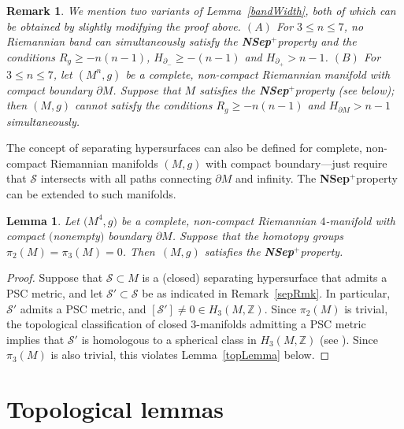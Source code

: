 \documentclass[10pt,a4paper]{amsart}
\numberwithin{equation}{section}
\newtheorem{Lemma}[Theorem]{Lemma}
\newtheorem{Remark}[Theorem]{Remark} }
\def\Z{\mathbb{Z}}
\def\Scal{\mathcal{S}}
\def\Nsep{\textbf{\textup{NSep}$^+$}}
\begin{document}
\begin{Remark}\label{bandNonexistence}
	We mention two variants of Lemma~\ref{bandWidth}, both of which can be obtained
	by slightly modifying the proof above.
	$(A)$ For $3\le n\le 7$,
	no Riemannian band can simultaneously satisfy the \Nsep property and
	the conditions
	$R_g \ge -n(n-1)$, $H_{\partial_-} \ge -(n-1)$ and $H_{\partial_+}> n-1$.
	$(B)$ For $3\le n\le 7$, let $(M^n,g)$ be a complete, non-compact Riemannian
	manifold with compact boundary $\partial M$. Suppose that
	$M$ satisfies the \Nsep property (see below); then $(M,g)$ cannot satisfy
	the conditions $R_g \ge -n(n-1)$ and $H_{\partial M} > n-1$ simultaneously.
\end{Remark}

The concept of separating hypersurfaces can also be defined for complete, non-compact Riemannian manifolds $(M,g)$ with compact boundary---just require that $\Scal$ intersects with all paths connecting $\partial M$ and infinity. The
\Nsep property can be extended to such manifolds.

\begin{Lemma}\label{4dNSepLemma}
	Let $\big(M^4, g\big)$ be a complete, non-compact Riemannian $4$-manifold with compact $($nonempty$)$ boundary $\partial M$.
Suppose that the homotopy groups $\pi_2(M) = \pi_3(M) = 0$. Then~$(M,g)$ satisfies the \Nsep property.
\end{Lemma}
\begin{proof}
	Suppose that $\Scal\subset M$ is a (closed) separating hypersurface that
	admits a PSC metric, and let $\Scal'\subset \Scal$ be as indicated
	in Remark~\ref{sepRmk}. In particular, $\Scal'$ admits a PSC metric, and
	 $[\Scal']\ne 0\in H_3(M,\Z)$.
	Since $\pi_2(M)$ is trivial, the topological classification of
	closed 3-manifolds admitting
	a PSC metric implies that
	$\Scal'$ is homologous to a spherical class in $H_{3}(M,\Z)$
	(see \cite[p. 112]{WangJthesis}). Since $\pi_3(M)$ is also trivial, this violates
	Lemma~\ref{topLemma} below.
\end{proof}


\section{Topological lemmas}\label{TopologicalLemmas}
\end{document}
